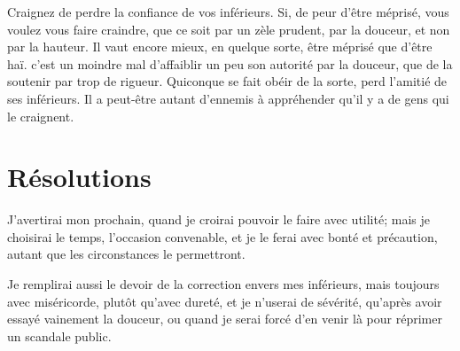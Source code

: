 \documentclass[instructions.tex]{subfiles}
\begin{document}
\tertio Craignez de perdre la confiance de vos inférieurs. Si, de peur d’être méprisé, vous voulez vous faire craindre, que ce soit par un zèle prudent, par la douceur, et non par la hauteur. Il vaut encore mieux, en quelque sorte, être méprisé que d’être haï. c’est un moindre mal d’affaiblir un peu son autorité par la douceur, que de la soutenir par trop de rigueur. Quiconque se fait obéir de la sorte, perd l’amitié de ses inférieurs. Il a peut-être autant d’ennemis à appréhender qu’il y a de gens qui le craignent.
 
\section{Résolutions}
 
\primo J’avertirai mon prochain, quand je croirai pouvoir le faire avec utilité; mais je choisirai le temps, l’occasion convenable, et je le ferai avec bonté et précaution, autant que les circonstances le permettront.
 
\secundo Je remplirai aussi le devoir de la correction envers mes inférieurs, mais toujours avec miséricorde, plutôt qu’avec dureté, et je n’userai de sévérité, qu’après avoir essayé vainement la douceur, ou quand je serai forcé d’en venir là pour réprimer un scandale public. 

 
\end{document}
